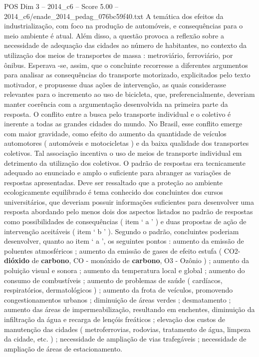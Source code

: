 \begin{textsample}{POS Dim 3 – 2014\_c6 – Score 5.00 – 2014\_c6/enade\_2014\_pedag\_076bc59f40.txt}
A temática dos efeitos da industrialização, com foco na produção de automóveis, e consequências para o meio ambiente é atual.
Além disso, a questão provoca a reflexão sobre a necessidade de adequação das cidades ao número de habitantes, no contexto da utilização dos meios de transportes de massa : metroviário, ferroviário, por ônibus.
Esperava -se, assim, que o concluinte recorresse a diferentes argumentos para analisar as consequências do transporte motorizado, explicitados pelo texto motivador, e propusesse duas ações de intervenção, as quais considerasse relevantes para o incremento ao uso de bicicleta, que, preferencialmente, deveriam manter coerência com a argumentação desenvolvida na primeira parte da resposta.
O conflito entre a busca pelo transporte individual e o coletivo é inerente a todas as grandes cidades do mundo.
No Brasil, esse conflito emerge com maior gravidade, como efeito do aumento da quantidade de veículos automotores ( automóveis e motocicletas ) e da baixa qualidade dos transportes coletivos.
Tal associação incentiva o uso de meios de transporte individual em detrimento da utilização dos coletivos.
O padrão de respostas era tecnicamente adequado ao enunciado e amplo o suficiente para abranger as variações de respostas apresentadas.
Deve ser ressaltado que a proteção ao ambiente ecologicamente equilibrado é tema conhecido dos concluintes dos cursos universitários, que deveriam possuir informações suficientes para desenvolver uma resposta abordando pelo menos dois dos aspectos listados no padrão de respostas como possibilidades de consequências ( item ‘ a ’ ) e duas propostas de ação de intervenção aceitáveis ( item ‘ b ’ ).
Segundo o padrão, concluintes poderiam desenvolver, quanto ao item ‘ a ’, os seguintes pontos : aumento da emissão de poluentes atmosféricos ; aumento da emissão de gases de efeito estufa ( CO2- \textbf{dióxido} de \textbf{carbono}, CO - monóxido de \textbf{carbono}, O3 - Ozônio ) ; aumento da poluição visual e sonora ; aumento da temperatura local e global ; aumento do consumo de combustíveis ; aumento de problemas de saúde ( cardíacos, respiratórios, dermatológicos ) ; aumento da frota de veículos, promovendo congestionamentos urbanos ; diminuição de áreas verdes ; desmatamento ; aumento das áreas de impermeabilização, resultando em enchentes, diminuição da infiltração da água e recarga de lençóis freáticos ; elevação dos custos de manutenção das cidades ( metroferrovias, rodovias, tratamento de água, limpeza da cidade, etc. ) ; necessidade de ampliação de vias trafegáveis ; necessidade de ampliação de áreas de estacionamento.

\end{textsample}
